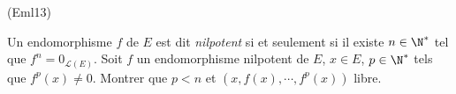 \begin{tiny}(Eml13)\end{tiny} Un endomorphisme $f$ de $E$ est dit \emph{nilpotent} si et seulement si il existe $n\in \N^*$ tel que 
$f^n = 0_{\mathcal{L}(E)}$. Soit $f$ un endomorphisme nilpotent de $E$, $x\in E$, $p\in \N^*$ tels que $f^p(x)\neq 0$.\newline
Montrer que $p < n$ et $(x, f(x),\cdots, f^p(x))$ libre.  